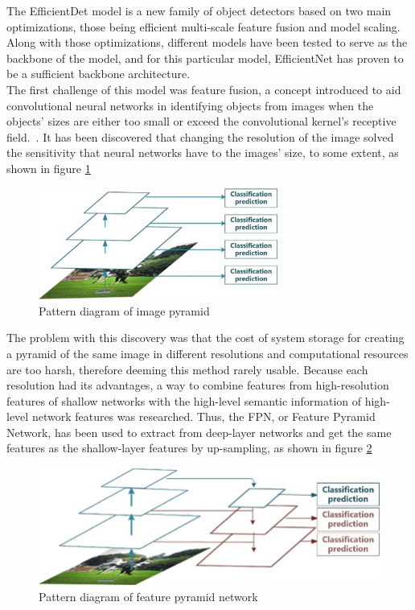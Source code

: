 The EfficientDet model is a new family of object detectors based on two main optimizations, those being efficient multi-scale feature fusion and model scaling. Along with those optimizations, different models have been tested to serve as the backbone of the model, and for this particular model, EfficientNet has proven to be a sufficient backbone architecture.~\cite{carte8}\\
The first challenge of this model was feature fusion, a concept introduced to aid convolutional neural networks in identifying objects from images when the objects' sizes are either too small or exceed the convolutional kernel's receptive field.~\cite{carte9}. It has been discovered that changing the resolution of the image solved the sensitivity that neural networks have to the images' size, to some extent, as shown in figure \ref{fig:fig4}\\
\begin{figure}[!ht]
    \centering
    \includegraphics[width=0.7\textwidth]{figures/Figure4.png}
    \caption{Pattern diagram of image pyramid}
    \label{fig:fig4}
\end{figure}
The problem with this discovery was that the cost of system storage for creating a pyramid of the same image in different resolutions and computational resources are too harsh, therefore deeming this method rarely usable. Because each resolution had its advantages, a way to combine features from high-resolution features of shallow networks with the high-level semantic information of high-level network features was researched. Thus, the FPN, or Feature Pyramid Network, has been used to extract from deep-layer networks and get the same features as the shallow-layer features by up-sampling, as shown in figure \ref{fig:fig5}\\ 
\begin{figure}[!ht]
    \centering
    \includegraphics[width=0.7\linewidth]{figures/Figure5.png}
    \caption{Pattern diagram of feature pyramid network}
    \label{fig:fig5}
\end{figure}
